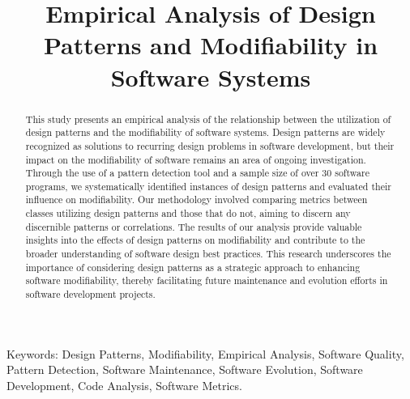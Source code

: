 \documentclass[conference]{IEEEtran}
\begin{document}
	
	\title{Empirical Analysis of Design Patterns and Modifiability in Software Systems}
	\author{
		\and
		}
	
	\maketitle
	
	
	\begin{abstract}
		This study presents an empirical analysis of the relationship between the utilization of design patterns and the modifiability of software systems. Design patterns are widely recognized as solutions to recurring design problems in software development, but their impact on the modifiability of software remains an area of ongoing investigation. Through the use of a pattern detection tool and a sample size of over 30 software programs, we systematically identified instances of design patterns and evaluated their influence on modifiability. Our methodology involved comparing metrics between classes utilizing design patterns and those that do not, aiming to discern any discernible patterns or correlations. The results of our analysis provide valuable insights into the effects of design patterns on modifiability and contribute to the broader understanding of software design best practices. This research underscores the importance of considering design patterns as a strategic approach to enhancing software modifiability, thereby facilitating future maintenance and evolution efforts in software development projects.
	\end{abstract}
	
	\begin{IEEEkeywords}
		Keywords: Design Patterns, Modifiability, Empirical Analysis, Software Quality, Pattern Detection, Software Maintenance, Software Evolution, Software Development, Code Analysis, Software Metrics.
	\end{IEEEkeywords}
	
\end{document}
